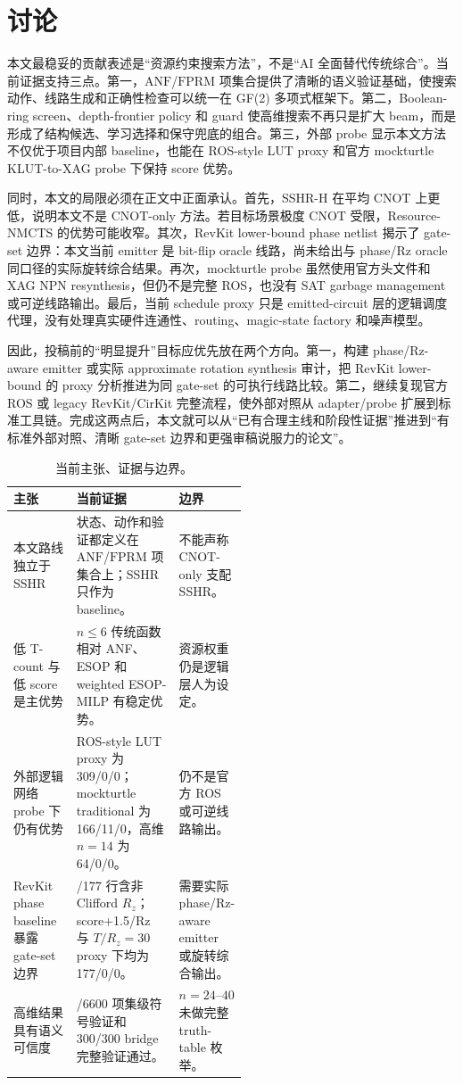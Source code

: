 \documentclass[UTF8,fontset=macnew,11pt]{ctexart}
\newcommand{\method}{Resource-NMCTS}
\newcommand{\anf}{\ensuremath{\mathrm{ANF}}}
\newcommand{\fprm}{\ensuremath{\mathrm{FPRM}}}
\newcommand{\rz}{\ensuremath{R_z}}
\newcommand{\ttable}{truth-table}
\begin{document}
\section{讨论}

本文最稳妥的贡献表述是“资源约束搜索方法”，不是“AI 全面替代传统综合”。当前证据支持三点。第一，\anf{}/\fprm{} 项集合提供了清晰的语义验证基础，使搜索动作、线路生成和正确性检查可以统一在 GF(2) 多项式框架下。第二，Boolean-ring screen、depth-frontier policy 和 guard 使高维搜索不再只是扩大 beam，而是形成了结构候选、学习选择和保守兜底的组合。第三，外部 probe 显示本文方法不仅优于项目内部 baseline，也能在 ROS-style LUT proxy 和官方 mockturtle KLUT-to-XAG probe 下保持 score 优势。

同时，本文的局限必须在正文中正面承认。首先，SSHR-H 在平均 CNOT 上更低，说明本文不是 CNOT-only 方法。若目标场景极度 CNOT 受限，\method{} 的优势可能收窄。其次，RevKit lower-bound phase netlist 揭示了 gate-set 边界：本文当前 emitter 是 bit-flip oracle 线路，尚未给出与 phase/Rz oracle 同口径的实际旋转综合结果。再次，mockturtle probe 虽然使用官方头文件和 XAG NPN resynthesis，但仍不是完整 ROS，也没有 SAT garbage management 或可逆线路输出。最后，当前 schedule proxy 只是 emitted-circuit 层的逻辑调度代理，没有处理真实硬件连通性、routing、magic-state factory 和噪声模型。

因此，投稿前的“明显提升”目标应优先放在两个方向。第一，构建 phase/Rz-aware emitter 或实际 approximate rotation synthesis 审计，把 RevKit lower-bound 的 proxy 分析推进为同 gate-set 的可执行线路比较。第二，继续复现官方 ROS 或 legacy RevKit/CirKit 完整流程，使外部对照从 adapter/probe 扩展到标准工具链。完成这两点后，本文就可以从“已有合理主线和阶段性证据”推进到“有标准外部对照、清晰 gate-set 边界和更强审稿说服力的论文”。

\begin{table}[H]
\centering
\small
\caption{当前主张、证据与边界。}
\label{tab:evidence-map}
\begin{tabularx}{\linewidth}{>{\raggedright\arraybackslash}p{0.27\linewidth}>{\raggedright\arraybackslash}X>{\raggedright\arraybackslash}p{0.25\linewidth}}
\toprule
主张 & 当前证据 & 边界 \\
\midrule
本文路线独立于 SSHR & 状态、动作和验证都定义在 \anf{}/\fprm{} 项集合上；SSHR 只作为 baseline。 & 不能声称 CNOT-only 支配 SSHR。 \\
低 T-count 与低 score 是主优势 & $n\leq6$ 传统函数相对 ANF、ESOP 和 weighted ESOP-MILP 有稳定优势。 & 资源权重仍是逻辑层人为设定。 \\
外部逻辑网络 probe 下仍有优势 & ROS-style LUT proxy 为 309/0/0；mockturtle traditional 为 166/11/0，高维 $n=14$ 为 64/0/0。 & 仍不是官方 ROS 或可逆线路输出。 \\
RevKit phase baseline 暴露 gate-set 边界 & 171/177 行含非 Clifford \rz{}；score+1.5/Rz 与 $T/R_z=30$ proxy 下均为 177/0/0。 & 需要实际 phase/Rz-aware emitter 或旋转综合输出。 \\
高维结果具有语义可信度 & 6600/6600 项集级符号验证和 300/300 bridge 完整验证通过。 & $n=24$--$40$ 未做完整 \ttable{} 枚举。 \\
\bottomrule
\end{tabularx}
\end{table}
\end{document}
